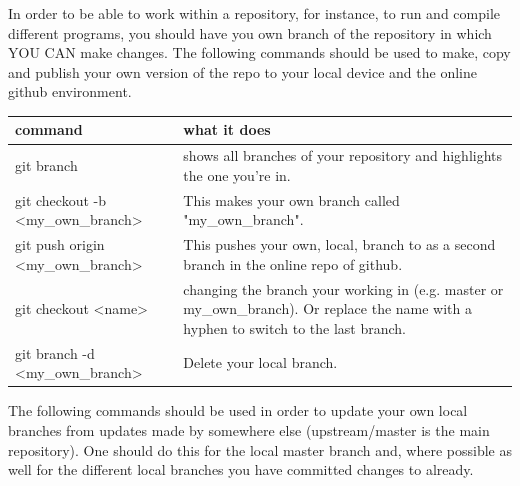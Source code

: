 In order to be able to work within a repository, for instance, to run and compile different programs, you should have you own branch of the repository in which YOU CAN make changes. The following commands should be used to make, copy and publish your own version of the repo to your local device and the online github environment.

\begin{center}
\begin{tabular}{p{6cm}|p{9cm}}
\textbf{command} &  \textbf{what it does} \\
\hline
  git branch & shows all branches of your repository and highlights the one you're in. \\
  git checkout -b \textless my\_own\_branch\textgreater & This makes your own branch called "my\_own\_branch". \\
  git push origin \textless my\_own\_branch\textgreater & This pushes your own, local, branch to as a second branch in the online repo of github. \\
  git checkout \textless name\textgreater & changing the branch your working in (e.g. master or my\_own\_branch). Or replace the name with a hyphen to switch to the last branch.\\
  git branch -d \textless my\_own\_branch\textgreater & Delete your local branch. \\
  \end{tabular}
\end{center}

  The following commands should be used in order to update your own local branches from updates made by somewhere else (upstream/master is the main repository). One should do this for the local master branch and, where possible as well for the different local branches you have committed changes to already. 

